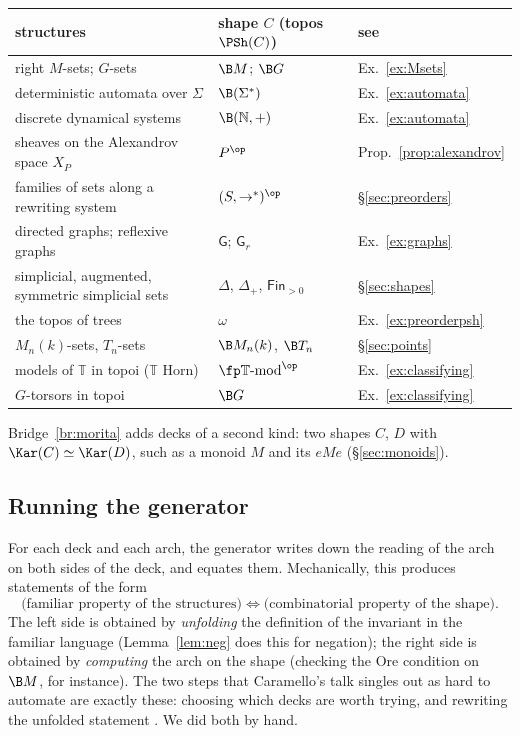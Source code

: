 \begin{center}\small
\begin{tabularx}{\linewidth}{>{\raggedright\arraybackslash}X>{\raggedright\arraybackslash}p{5cm}l}
\toprule
structures & shape $C$ (topos $\PSh(C)$) & see\\
\midrule
right $M$-sets; $G$-sets & $\B M$; $\B G$ & Ex.~\ref{ex:Msets}\\
deterministic automata over $\Sigma$ & $\B(\Sigma^*)$ & Ex.~\ref{ex:automata}\\
discrete dynamical systems & $\B(\mathbb N,+)$ & Ex.~\ref{ex:automata}\\
sheaves on the Alexandrov space $X_P$ & $P^{\op}$ & Prop.~\ref{prop:alexandrov}\\
families of sets along a rewriting system & $(S,\to^*)^{\op}$ & \S\ref{sec:preorders}\\
directed graphs; reflexive graphs & $\mathsf G$; $\mathsf G_r$ & Ex.~\ref{ex:graphs}\\
simplicial, augmented, symmetric simplicial sets & $\Delta$, $\Delta_+$, $\mathsf{Fin}_{>0}$ & \S\ref{sec:shapes}\\
the topos of trees & $\omega$ & Ex.~\ref{ex:preorderpsh}\\
$M_n(k)$-sets, $T_n$-sets & $\B M_n(k)$, $\B T_n$ & \S\ref{sec:points}\\
models of $\mathbb T$ in topoi ($\mathbb T$ Horn) & $\fp\mathbb T\text{-mod}^{\op}$ & Ex.~\ref{ex:classifying}\\
$G$-torsors in topoi & $\B G$ & Ex.~\ref{ex:classifying}\\
\bottomrule
\end{tabularx}
\end{center}

Bridge~\ref{br:morita} adds decks of a second kind: two shapes $C$, $D$ with $\Kar(C)\simeq\Kar(D)$, such as a monoid $M$ and its  $eMe$ (\S\ref{sec:monoids}).

\subsection{Running the generator}

For each deck and each arch, the generator writes down the reading of the arch on both sides of the deck, and equates them. Mechanically, this produces statements of the form
\[
\text{(familiar property of the structures)}\iff\text{(combinatorial property of the shape)}.
\]
The left side is obtained by \emph{unfolding} the definition of the invariant in the familiar language (Lemma~\ref{lem:neg} does this for negation); the right side is obtained by \emph{computing} the arch on the shape (checking the Ore condition on $\B M$, for instance). The two steps that Caramello's talk singles out as hard to automate are exactly these: choosing which decks are worth trying, and rewriting the unfolded statement  \cite[slide 17]{caramello-mines}. We did both by hand.

